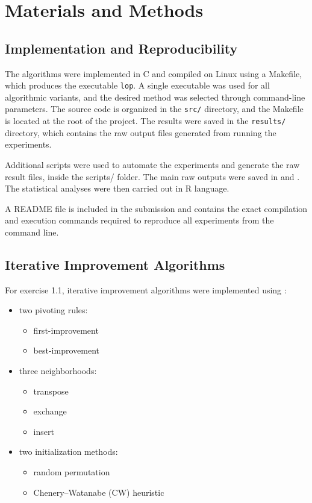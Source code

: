 \section{Materials and Methods}\label{sec:materialAndMethods}

\subsection{Implementation and Reproducibility}

The algorithms were implemented in C and compiled on Linux using a Makefile, which produces the executable \texttt{lop}. A single executable was used for all algorithmic variants, and the desired method was selected through command-line parameters. The source code is organized in the \texttt{src/} directory, and the Makefile is located at the root of the project. The results were saved in the \texttt{results/} directory, which contains the raw output files generated from running the experiments.

Additional scripts were used to automate the experiments and generate the raw result files, inside the scripts/ folder. The main raw outputs were saved in  and . The statistical analyses were then carried out in R language.

A README file is included in the submission and contains the exact compilation and execution commands required to reproduce all experiments from the command line.

\subsection{Iterative Improvement Algorithms}

For exercise 1.1, iterative improvement algorithms were implemented using :
\begin{itemize}[leftmargin=1.5em]
    \item two pivoting rules:
    \begin{itemize}
        \item first-improvement
        \item best-improvement
    \end{itemize}
    \item three neighborhoods:
    \begin{itemize}
        \item transpose
        \item exchange
        \item insert
    \end{itemize}
    \item two initialization methods:
    \begin{itemize}
        \item random permutation
        \item Chenery--Watanabe (CW) heuristic
    \end{itemize}
\end{itemize}

